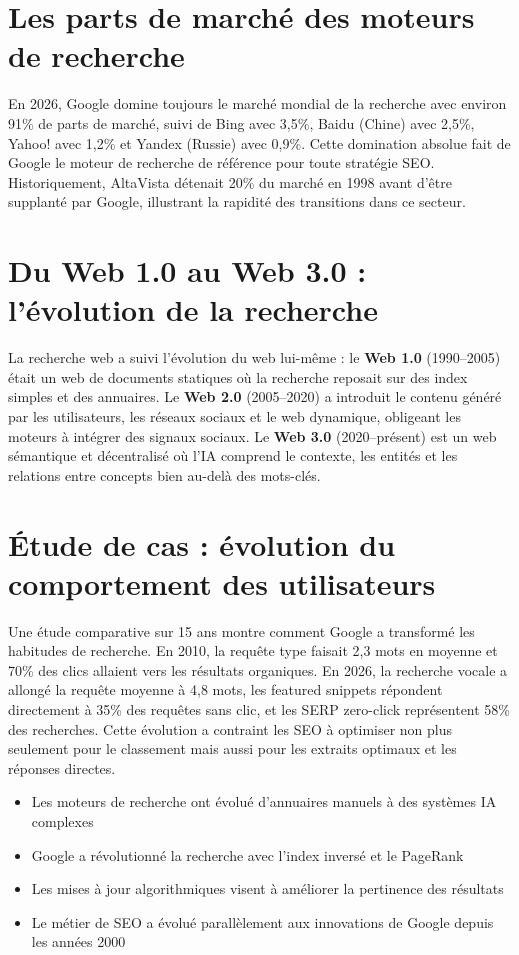 \documentclass[12pt,a4paper,twoside]{report}
\newcommand{\keyword}[1]{\textbf{\textcolor{googleblue}{#1}}}
\begin{document}
\section{Les parts de marché des moteurs de recherche}

En 2026, Google domine toujours le marché mondial de la recherche avec environ 91\% de parts de marché, suivi de Bing avec 3,5\%, Baidu (Chine) avec 2,5\%, Yahoo! avec 1,2\% et Yandex (Russie) avec 0,9\%. Cette domination absolue fait de Google le moteur de recherche de référence pour toute stratégie SEO. Historiquement, AltaVista détenait 20\% du marché en 1998 avant d'être supplanté par Google, illustrant la rapidité des transitions dans ce secteur.

\section{Du Web 1.0 au Web 3.0 : l'évolution de la recherche}

La recherche web a suivi l'évolution du web lui-même : le \keyword{Web 1.0} (1990--2005) était un web de documents statiques où la recherche reposait sur des index simples et des annuaires. Le \keyword{Web 2.0} (2005--2020) a introduit le contenu généré par les utilisateurs, les réseaux sociaux et le web dynamique, obligeant les moteurs à intégrer des signaux sociaux. Le \keyword{Web 3.0} (2020--présent) est un web sémantique et décentralisé où l'IA comprend le contexte, les entités et les relations entre concepts bien au-delà des mots-clés.

\section{Étude de cas : évolution du comportement des utilisateurs}

Une étude comparative sur 15 ans montre comment Google a transformé les habitudes de recherche. En 2010, la requête type faisait 2,3 mots en moyenne et 70\% des clics allaient vers les résultats organiques. En 2026, la recherche vocale a allongé la requête moyenne à 4,8 mots, les featured snippets répondent directement à 35\% des requêtes sans clic, et les SERP zero-click représentent 58\% des recherches. Cette évolution a contraint les SEO à optimiser non plus seulement pour le classement mais aussi pour les extraits optimaux et les réponses directes.

\begin{takeaways}
\begin{itemize}
    \item Les moteurs de recherche ont évolué d'annuaires manuels à des systèmes IA complexes
    \item Google a révolutionné la recherche avec l'index inversé et le PageRank
    \item Les mises à jour algorithmiques visent à améliorer la pertinence des résultats
    \item Le métier de SEO a évolué parallèlement aux innovations de Google depuis les années 2000
\end{itemize}
\end{takeaways}
\end{document}
